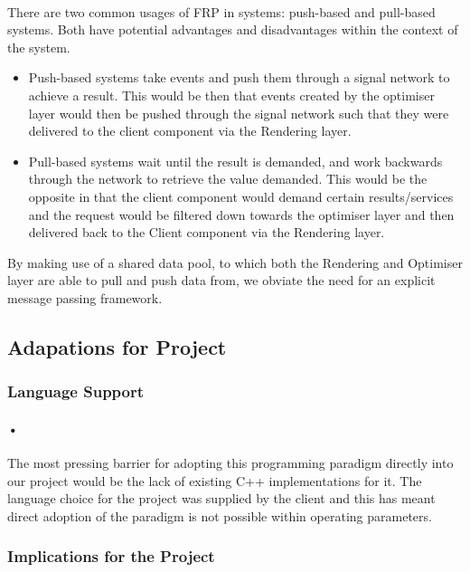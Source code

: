 \documentclass[11pt]{article}
\begin{document}
\paragraph{}
There are two common usages of FRP in systems: push-based and pull-based systems. Both have potential advantages and disadvantages within the context of the system.

\begin{itemize}
\item Push-based systems take events and push them through a signal network to achieve a result. This would be then that events created by the optimiser layer would then be pushed through the signal network such that they were delivered to the client component via the Rendering layer.

\item Pull-based systems wait until the result is demanded, and work backwards through the network to retrieve the value demanded. This would be the opposite in that the client component would demand certain results/services and the request would be filtered down towards the optimiser layer and then delivered back to the Client component via the Rendering layer.
\end{itemize}

By making use of a shared data pool, to which both the Rendering and Optimiser layer are able to pull and push data from, we obviate the need for an explicit message passing framework.

\subsection{Adapations for Project}
\subsubsection{Language Support}
\paragraph{•}
The most pressing barrier for adopting this programming paradigm directly into our project would be the lack of existing C++ implementations for it. The language choice for the project was supplied by the client and this has meant direct adoption of the paradigm is not possible within operating parameters.
\subsubsection{Implications for the Project}
\end{document}
